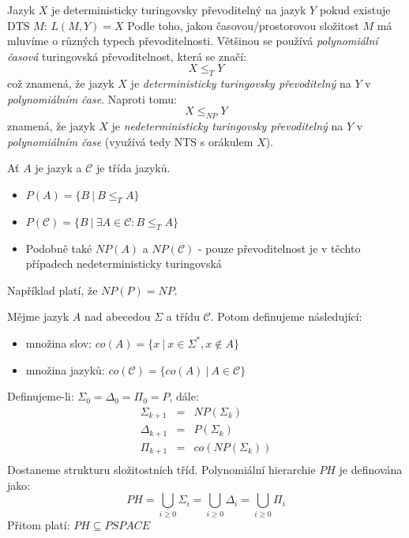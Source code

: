 \documentclass[a4paper]{article}      %
\newenvironment{definition}[1][Definice]{\begin{trivlist}
\item[\hskip \labelsep {\bfseries #1}]}{\end{trivlist}}
\newenvironment{example}[1][Příklad]{\begin{trivlist}
\item[\hskip \labelsep {\bfseries #1}]}{\end{trivlist}}
\begin{document}
\begin{definition}[Turingovská převoditelnost]
Jazyk $X$ je deterministicky turingovsky převoditelný na jazyk $Y$ pokud existuje DTS $M$: $L(M,Y)=X$
Podle toho, jakou časovou/prostorovou složitost $M$ má mluvíme o různých typech převoditelnosti.
Většinou se používá \emph{polynomiální časová} turingovská převoditelnost, která se značí:
\[
X \leq_{T} Y
\]
což znamená, že jazyk $X$ je \emph{deterministicky turingovsky převoditelný} na $Y$ v \emph{polynomiálním čase}.
Naproti tomu:
\[
X \leq_{NP} Y
\]
znamená, že jazyk $X$ je \emph{nedeterministicky turingovsky převoditelný} na $Y$ v \emph{polynomiálním čase}
(využívá tedy NTS s orákulem $X$).
\end{definition}

\begin{definition}[Relativizované třídy]
Ať $A$ je jazyk a $\mathcal{C}$ je třída jazyků.
\begin{itemize}
\item $P(A) = \lbrace B\ |\ B \leq_{T} A \rbrace$
\item $P(\mathcal{C}) = \lbrace B\ |\ \exists A\in \mathcal{C}: B \leq_{T} A\rbrace$
\item Podobně také $NP(A)$ a $NP(\mathcal{C})$ - pouze převoditelnost je v těchto případech nedeterministicky turingovská
\end{itemize}
\end{definition}

\begin{example}[Relativizace.]
Například platí, že $NP(P) = NP$.
\end{example}

\begin{definition}[Doplňky jazyků a složitostních tříd.] Mějme jazyk $A$ nad abecedou $\Sigma$ a třídu $\mathcal{C}$. Potom definujeme následující:
\begin{itemize}
\item množina slov: $co(A) = \lbrace x\ |\ x\in \Sigma^{*}, x\notin A\rbrace$
\item množina jazyků: $co(\mathcal{C}) = \lbrace co(A)\ |\ A\in \mathcal{C}\rbrace$
\end{itemize} 
\end{definition}

\begin{definition}[Polynomiální hierarchie]
Definujeme-li: $\Sigma_0 = \Delta_0 = \Pi_0 = P$, dále:
\[
\begin{array}{lcl}
\Sigma_{k+1} & = & NP(\Sigma_k)\\
\Delta_{k+1} & = & P(\Sigma_k)\\
\Pi_{k+1} & = & co(NP(\Sigma_k))\\
\end{array}
\]
Dostaneme strukturu složitostních tříd. Polynomiální hierarchie $PH$ je definována jako:
\[
PH = \bigcup_{i \geq 0} \Sigma_{i} = \bigcup_{i \geq 0} \Delta_{i} = \bigcup_{i \geq 0} \Pi_{i}  
\]
Přitom platí: $PH \subseteq PSPACE$
\end{definition}
\end{document}
